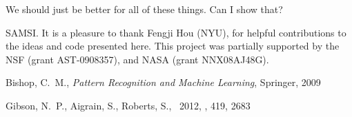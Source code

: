 \documentclass[preprint,12pt]{aastex}
\begin{document}
We should just be better for all of these things.
Can I show that?


\acknowledgments
SAMSI. %
It is a pleasure to thank
    Fengji Hou (NYU),
for helpful contributions to the ideas and code presented here.
This project was partially supported by the NSF (grant AST-0908357), and NASA
(grant NNX08AJ48G).

\newcommand{\arxiv}[1]{\href{http://arxiv.org/abs/#1}{arXiv:#1}}
\begin{thebibliography}{}\raggedright

Bishop, C.~M., \emph{Pattern Recognition and Machine Learning}, Springer, 2009

Gibson, N.~P., Aigrain, S., Roberts, S., \etal\ 2012, \mnras, 419, 2683

\end{thebibliography}
\end{document}
